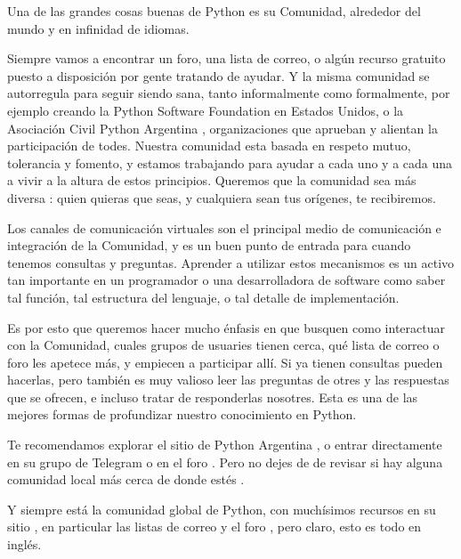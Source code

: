 Una de las grandes cosas buenas de Python es su Comunidad, alrededor del mundo y en infinidad de idiomas.

Siempre vamos a encontrar un foro, una lista de correo, o algún recurso gratuito puesto a disposición por gente tratando de ayudar. Y la misma comunidad se autorregula para seguir siendo sana, tanto informalmente como formalmente, por ejemplo creando la Python Software Foundation en Estados Unidos, o la Asociación Civil Python Argentina \cite{asoc_civil_pyar}, organizaciones que aprueban y alientan la participación de todes. Nuestra comunidad esta basada en respeto mutuo, tolerancia y fomento, y estamos trabajando para ayudar a cada uno y a cada una a vivir a la altura de estos principios. Queremos que la comunidad sea más diversa \cite{diversidad}: quien quieras que seas, y cualquiera sean tus orígenes, te recibiremos.

Los canales de comunicación virtuales son el principal medio de comunicación e integración de la Comunidad, y es un buen punto de entrada para cuando tenemos consultas y preguntas. Aprender a utilizar estos mecanismos es un activo tan importante en un programador o una desarrolladora de software como saber tal función, tal estructura del lenguaje, o tal detalle de implementación.

Es por esto que queremos hacer mucho énfasis en que busquen como interactuar con la Comunidad, cuales grupos de usuaries tienen cerca, qué lista de correo o foro les apetece más, y empiecen a participar allí. Si ya tienen consultas pueden hacerlas, pero también es muy valioso leer las preguntas de otres y las respuestas que se ofrecen, e incluso tratar de responderlas nosotres. Esta es una de las mejores formas de profundizar nuestro conocimiento en Python.

Te recomendamos explorar el sitio de Python Argentina \cite{pyar}, o entrar directamente en su grupo de Telegram \cite{pyar_telegram} o en el foro \cite{pyar_foro}. Pero no dejes de de revisar si hay alguna comunidad local más cerca de donde estés \cite{python_lugs}.

Y siempre está la comunidad global de Python, con muchísimos recursos en su sitio \cite{python_org}, en particular las listas de correo \cite{python_lists} y el foro \cite{python_forum}, pero claro, esto es todo en inglés.
